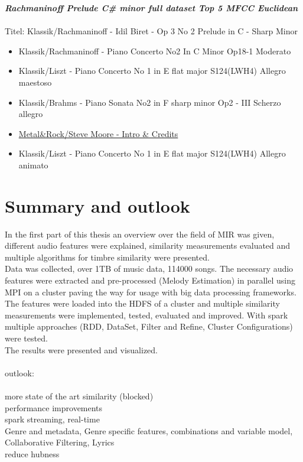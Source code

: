 \textit{\textbf{Rachmaninoff Prelude C\# minor full dataset Top 5 MFCC Euclidean\\}}
\\
Titel: Klassik/Rachmaninoff - Idil Biret - Op 3 No 2 Prelude in C - Sharp Minor
\begin{itemize}
	\setlength\itemsep{-0.5em}
	\item Klassik/Rachmaninoff - Piano Concerto No2 In C Minor Op18-1 Moderato
	\item Klassik/Liszt - Piano Concerto No 1 in E flat major S124(LWH4) Allegro maestoso
	\item Klassik/Brahms - Piano Sonata No2 in F sharp minor Op2 - III Scherzo allegro
	\item \underline{Metal\&Rock/Steve Moore - Intro \& Credits}
	\item Klassik/Liszt - Piano Concerto No 1 in E flat major S124(LWH4) Allegro animato
\end{itemize}

\section{Summary and outlook}

In the first part of this thesis an overview over the field of MIR was given, different audio features were explained, similarity measurements evaluated and multiple algorithms for timbre similarity were presented.\\
Data was collected, over 1TB of music data, 114000 songs. The necessary audio features were extracted and pre-processed (Melody Estimation) in parallel using MPI on a cluster paving the way for usage with big data processing frameworks.\\
The features were loaded into the HDFS of a cluster and multiple similarity measurements were implemented, tested, evaluated and improved. With spark multiple approaches (RDD, DataSet, Filter and Refine, Cluster Configurations) were tested.\\
The results were presented and visualized.\\
\ \\
outlook:\\
\ \\
more state of the art similarity (blocked)\\
performance improvements\\
spark streaming, real-time\\
Genre and metadata, Genre specific features, combinations and variable model, Collaborative Filtering, Lyrics\\
reduce hubness\\

